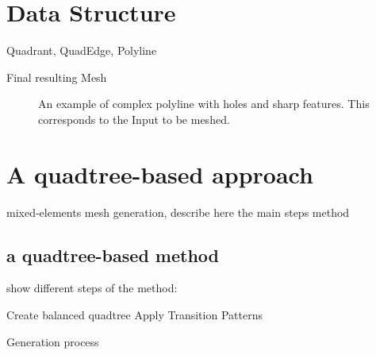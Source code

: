 \documentclass[10pt]{article}
\begin{document}
\section{Data Structure}
\label{sec:dataStruct}

Quadrant, QuadEdge, Polyline

Final resulting Mesh

 \begin{figure}[htb]
\centering
\caption{An example of complex polyline with holes and sharp features. This corresponds to the Input to be meshed.}
\label{fig:boundary}
\end{figure}


\section{A quadtree-based approach}
\label{sec:method}

mixed-elements mesh generation, describe here the main steps method

\subsection{a quadtree-based method}
show different steps of the method: 

\begin{algorithm}[H]



\SetAlgoLined
{}
 \nl {}
 \nl Create balanced quadtree\; \label{alg:goto}
 \nl Apply Transition Patterns\;
 \caption{Generation process}
 \label{alg:generate}
\end{algorithm}
\end{document}

